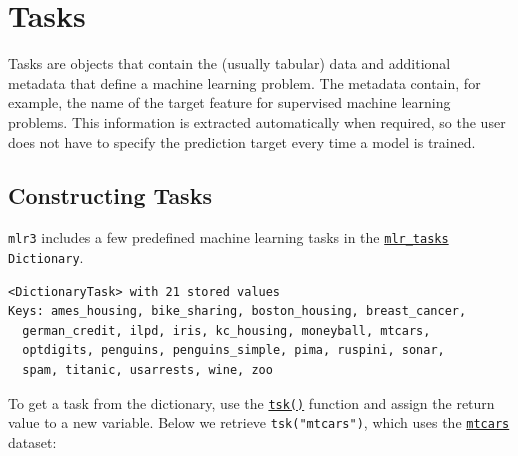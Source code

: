 \hypertarget{sec-tasks}{%
\section{Tasks}\label{sec-tasks}}

Tasks are objects that contain the (usually tabular) data
and additional metadata that define a machine learning problem. The
metadata contain, for example, the name of the target
feature for supervised machine learning problems. This information is
extracted automatically when required, so the user does not have to
specify the prediction target every time a model is trained.

\hypertarget{sec-tasks-built-in}{%
\subsection{Constructing Tasks}\label{sec-tasks-built-in}}

\texttt{mlr3} includes a few predefined machine learning tasks in the
\href{https://mlr3.mlr-org.com/reference/mlr_tasks.html}{\texttt{mlr\_tasks}}
\texttt{Dictionary}.

\begin{Shaded}
\begin{Highlighting}[]
\end{Highlighting}
\end{Shaded}

\begin{verbatim}
<DictionaryTask> with 21 stored values
Keys: ames_housing, bike_sharing, boston_housing, breast_cancer,
  german_credit, ilpd, iris, kc_housing, moneyball, mtcars,
  optdigits, penguins, penguins_simple, pima, ruspini, sonar,
  spam, titanic, usarrests, wine, zoo
\end{verbatim}

To get a task from the dictionary, use the
\href{https://mlr3.mlr-org.com/reference/mlr_sugar.html}{\texttt{tsk()}}
function and assign the return value to a new variable. Below we
retrieve \texttt{tsk("mtcars")}, which uses the
\href{https://www.rdocumentation.org/packages/datasets/topics/mtcars}{\texttt{mtcars}}
dataset:


